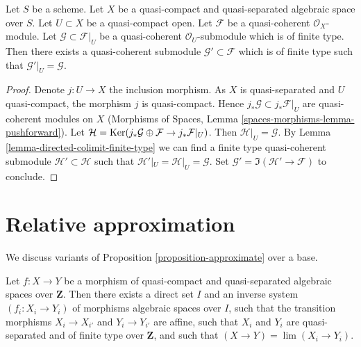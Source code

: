 \begin{lemma}
\label{lemma-extend}
Let $S$ be a scheme.
Let $X$ be a quasi-compact and quasi-separated algebraic space over $S$.
Let $U \subset X$ be a quasi-compact open.
Let $\mathcal{F}$ be a quasi-coherent $\mathcal{O}_X$-module.
Let $\mathcal{G} \subset \mathcal{F}|_U$ be a quasi-coherent
$\mathcal{O}_U$-submodule which is of finite type. Then
there exists a quasi-coherent submodule $\mathcal{G}' \subset \mathcal{F}$
which is of finite type such that $\mathcal{G}'|_U = \mathcal{G}$.
\end{lemma}

\begin{proof}
Denote $j : U \to X$ the inclusion morphism. As $X$ is quasi-separated
and $U$ quasi-compact, the morphism $j$ is quasi-compact. Hence
$j_*\mathcal{G} \subset j_*\mathcal{F}|_U$ are quasi-coherent modules
on $X$ (Morphisms of Spaces, Lemma
\ref{spaces-morphisms-lemma-pushforward}).
Let $\mathcal{H} =
\mathop{\mathrm{Ker}}(j_*\mathcal{G} \oplus \mathcal{F} \to j_*\mathcal{F}|_U)$.
Then $\mathcal{H}|_U = \mathcal{G}$. By
Lemma \ref{lemma-directed-colimit-finite-type}
we can find a finite type quasi-coherent submodule
$\mathcal{H}' \subset \mathcal{H}$ such that
$\mathcal{H}'|_U = \mathcal{H}|_U = \mathcal{G}$.
Set $\mathcal{G}' = \Im(\mathcal{H}' \to \mathcal{F})$
to conclude.
\end{proof}









\section{Relative approximation}
\label{section-relative-approximation}

\noindent
We discuss variants of Proposition \ref{proposition-approximate}
over a base.

\begin{lemma}
\label{lemma-approximate-morphism}
Let $f : X \to Y$ be a morphism of quasi-compact and quasi-separated
algebraic spaces over $\mathbf{Z}$.
Then there exists a direct set $I$ and an inverse system $(f_i : X_i \to Y_i)$
of morphisms algebraic spaces over $I$, such that the transition morphisms
$X_i \to X_{i'}$ and $Y_i \to Y_{i'}$ are affine, such that $X_i$
and $Y_i$ are quasi-separated and of finite type over $\mathbf{Z}$, and
such that $(X \to Y) = \lim (X_i \to Y_i)$.
\end{lemma}

